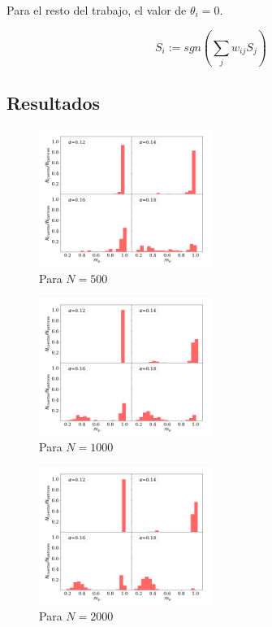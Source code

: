 Para el resto del trabajo, el valor de $\theta_i=0$.

\begin{equation}
	S_i := sgn(\sum_j w_{ij} S_j)
	\label{eq:hop_gen}
\end{equation}



\subsection{Resultados}


\begin{figure}[H]
	\centering
	\includegraphics[width=0.5\textwidth]{../Graficos/500.png}
	\caption{Para $N=500$}
	\label{fig:500}
\end{figure}



\begin{figure}[H]
	\centering
	\includegraphics[width=0.5\textwidth]{../Graficos/1000.png}
	\caption{Para $N=1000$}
	\label{fig:1000}
\end{figure}


\begin{figure}[H]
	\centering
	\includegraphics[width=0.5\textwidth]{../Graficos/2000.png}
	\caption{Para $N=2000$}
	\label{fig:2000}
\end{figure}



